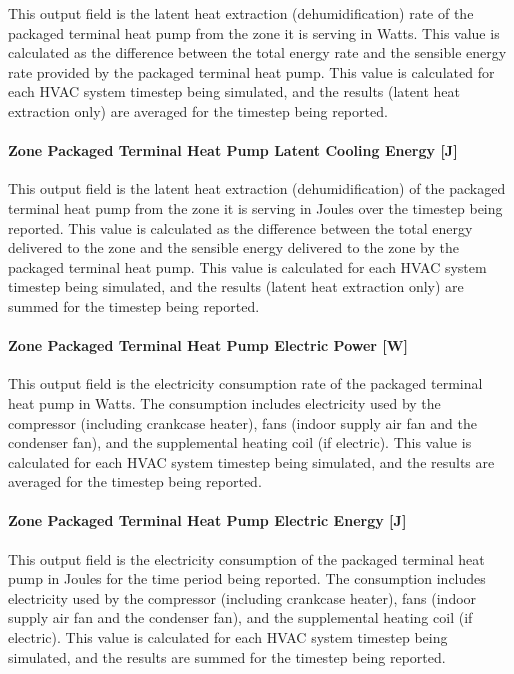 This output field is the latent heat extraction (dehumidification) rate of the packaged terminal heat pump from the zone it is serving in Watts. This value is calculated as the difference between the total energy rate and the sensible energy rate provided by the packaged terminal heat pump. This value is calculated for each HVAC system timestep being simulated, and the results (latent heat extraction only) are averaged for the timestep being reported.

\paragraph{Zone Packaged Terminal Heat Pump Latent Cooling Energy {[}J{]}}\label{zone-packaged-terminal-heat-pump-latent-cooling-energy-j}

This output field is the latent heat extraction (dehumidification) of the packaged terminal heat pump from the zone it is serving in Joules over the timestep being reported. This value is calculated as the difference between the total energy delivered to the zone and the sensible energy delivered to the zone by the packaged terminal heat pump. This value is calculated for each HVAC system timestep being simulated, and the results (latent heat extraction only) are summed for the timestep being reported.

\paragraph{Zone Packaged Terminal Heat Pump Electric Power {[}W{]}}\label{zone-packaged-terminal-heat-pump-electric-power-w}

This output field is the electricity consumption rate of the packaged terminal heat pump in Watts. The consumption includes electricity used by the compressor (including crankcase heater), fans (indoor supply air fan and the condenser fan), and the supplemental heating coil (if electric). This value is calculated for each HVAC system timestep being simulated, and the results are averaged for the timestep being reported.

\paragraph{Zone Packaged Terminal Heat Pump Electric Energy {[}J{]}}\label{zone-packaged-terminal-heat-pump-electric-energy-j}

This output field is the electricity consumption of the packaged terminal heat pump in Joules for the time period being reported. The consumption includes electricity used by the compressor (including crankcase heater), fans (indoor supply air fan and the condenser fan), and the supplemental heating coil (if electric). This value is calculated for each HVAC system timestep being simulated, and the results are summed for the timestep being reported.

